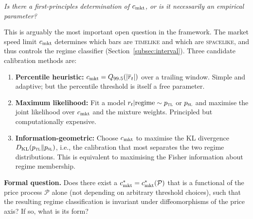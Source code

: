 \begin{openquestion}
\label{oq:c_market}
\emph{Is there a first-principles determination of $c_{\mathrm{mkt}}$, or is it
necessarily an empirical parameter?}

This is arguably the most important open question in the framework.  The
market speed limit $c_{\mathrm{mkt}}$ determines which bars are \textsc{timelike}
and which are \textsc{spacelike}, and thus controls the regime classifier
(Section~\ref{subsec:interval}).  Three candidate calibration methods are:

\begin{enumerate}
  \item \textbf{Percentile heuristic:} $c_{\mathrm{mkt}} = Q_{99.5}(|\overline{r}_t|)$
        over a trailing window.  Simple and adaptive; but the percentile
        threshold is itself a free parameter.

  \item \textbf{Maximum likelihood:} Fit a model
        $r_t | \text{regime} \sim p_{\textsc{tl}}$ or $p_{\textsc{sl}}$
        and maximise the joint likelihood over $c_{\mathrm{mkt}}$ and the mixture
        weights.  Principled but computationally expensive.

  \item \textbf{Information-geometric:} Choose $c_{\mathrm{mkt}}$ to maximise the
        KL divergence $D_{\mathrm{KL}}(p_{\textsc{tl}} \| p_{\textsc{sl}})$,
        i.e., the calibration that most separates the two regime distributions.
        This is equivalent to maximising the Fisher information about regime
        membership.
\end{enumerate}

\textbf{Formal question.}  Does there exist a $c_{\mathrm{mkt}}^* = c_{\mathrm{mkt}}^*(\mathcal{P})$
that is a functional of the price process $\mathcal{P}$ alone (not depending
on arbitrary threshold choices), such that the resulting regime classification
is invariant under diffeomorphisms of the price axis?  If so, what is its form?
\end{openquestion}


